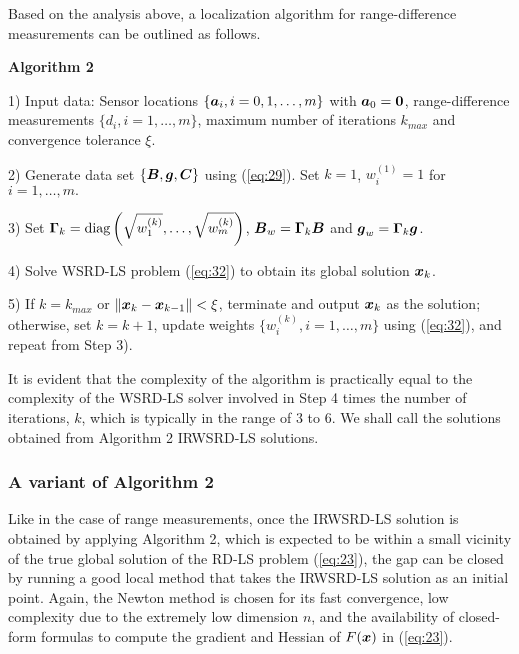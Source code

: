 Based on the analysis above, a localization algorithm for range-difference measurements can be outlined as follows.

\textbf{Algorithm 2}

1) Input data: Sensor locations $\{\mbox{\boldmath$a$}_i, i=0, 1,\ldots,m\}$ with $\mbox{\boldmath$a$}_0=\mbox{\boldmath{$0$}}$, range-difference measurements $\{d_i, i = 1,\ldots,m\}$, maximum number of iterations $k_{max}$ and convergence tolerance $\xi$.

2) Generate data set $\{\mbox{\boldmath$B$}, \mbox{\boldmath$g$}, \mbox{\boldmath$C$}\}$ using (\ref{eq:29}). Set $k=1$, $w_i^{(1)}=1$ for $i=1,\ldots,m.$

3) Set $\mbox{\boldmath{$\Gamma$}}_k=\mbox{diag}\left(\sqrt{w_1^{(k)}},\ldots,\sqrt{w_m^{(k)}}\right)$, $\mbox{\boldmath$B$}_w=\mbox{\boldmath{$\Gamma$}}_k\mbox{\boldmath$B$}$ and $\mbox{\boldmath$g$}_w=\mbox{\boldmath{$\Gamma$}}_k\mbox{\boldmath$g$}$.

4) Solve WSRD-LS problem (\ref{eq:32}) to obtain its global solution $\mbox{\boldmath$x$}_k$.

5) If $k=k_{max}$ or $\|\mbox{\boldmath$x$}_k-\mbox{\boldmath$x$}_{k-1}\|<\xi$, terminate and output $\mbox{\boldmath$x$}_k$ as the solution; otherwise, set $k=k+1$, update weights $\{w_i^{(k)}, i=1,\ldots,m\}$ using (\ref{eq:32}), and repeat from Step 3).

It is evident that the complexity of the algorithm is practically equal to the complexity of the WSRD-LS solver involved in Step 4 times the number of iterations, $k$, which is typically in the range of 3 to 6. We shall call the solutions obtained from Algorithm 2 IRWSRD-LS solutions.

\subsubsection{A variant of Algorithm 2}

Like in the case of range measurements, once the IRWSRD-LS solution is obtained by applying Algorithm 2, which is expected to be within a small vicinity of the true global solution of the RD-LS problem (\ref{eq:23}), the gap can be closed by running a good local method that takes the IRWSRD-LS solution as an initial point. Again, the Newton method is chosen for its fast convergence, low complexity due to the extremely low dimension $n$, and the availability of closed-form formulas to compute the gradient and Hessian of $F(\mbox{\boldmath$x$})$ in (\ref{eq:23}).

